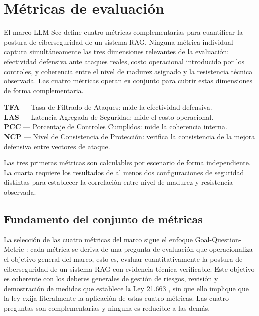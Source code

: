 \chapter{Métricas de evaluación}
\label{ch:metricas}

El marco LLM-Sec define cuatro métricas complementarias para cuantificar
la postura de ciberseguridad de un sistema RAG. Ninguna métrica individual
captura simultáneamente las tres dimensiones relevantes de la evaluación:
efectividad defensiva ante ataques reales, costo operacional introducido
por los controles, y coherencia entre el nivel de madurez asignado y la
resistencia técnica observada. Las cuatro métricas operan en conjunto para
cubrir estas dimensiones de forma complementaria.

\begin{infobox}
  \textbf{TFA} — Tasa de Filtrado de Ataques: mide la efectividad defensiva.\\
  \textbf{LAS} — Latencia Agregada de Seguridad: mide el costo operacional.\\
  \textbf{PCC} — Porcentaje de Controles Cumplidos: mide la coherencia interna.\\
  \textbf{NCP} — Nivel de Consistencia de Protección: verifica la consistencia de la mejora defensiva entre vectores de ataque.
\end{infobox}

Las tres primeras métricas son calculables por escenario de forma
independiente. La cuarta requiere los resultados de al menos dos
configuraciones de seguridad distintas para establecer la correlación
entre nivel de madurez y resistencia observada.

\section{Fundamento del conjunto de métricas}
\label{sec:fundamento-metricas}

La selección de las cuatro métricas del marco sigue el enfoque Goal-Question-Metric \cite{gqm}: cada métrica se deriva de una pregunta de evaluación que operacionaliza el objetivo general del marco, esto es, evaluar cuantitativamente la postura de ciberseguridad de un sistema RAG con evidencia técnica verificable. Este objetivo es coherente con los deberes generales de gestión de riesgos, revisión y demostración de medidas que establece la Ley 21.663 \cite{ley21663}, sin que ello implique que la ley exija literalmente la aplicación de estas cuatro métricas. Las cuatro preguntas son complementarias y ninguna es reducible a las demás.

